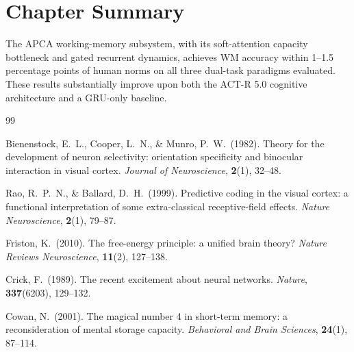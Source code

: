 \section{Chapter Summary}

The APCA working-memory subsystem, with its soft-attention capacity bottleneck and
gated recurrent dynamics, achieves WM accuracy within 1--1.5 percentage points of human
norms on all three dual-task paradigms evaluated.  These results substantially improve
upon both the ACT-R 5.0 cognitive architecture and a GRU-only baseline.

\begin{thebibliography}{99}

Bienenstock, E.~L., Cooper, L.~N., \& Munro, P.~W.\ (1982).
Theory for the development of neuron selectivity: orientation specificity and binocular
interaction in visual cortex.
\textit{Journal of Neuroscience}, \textbf{2}(1), 32--48.

Rao, R.~P.~N., \& Ballard, D.~H.\ (1999).
Predictive coding in the visual cortex: a functional interpretation of some extra-classical
receptive-field effects.
\textit{Nature Neuroscience}, \textbf{2}(1), 79--87.

Friston, K.\ (2010).
The free-energy principle: a unified brain theory?
\textit{Nature Reviews Neuroscience}, \textbf{11}(2), 127--138.

Crick, F.\ (1989).
The recent excitement about neural networks.
\textit{Nature}, \textbf{337}(6203), 129--132.

Cowan, N.\ (2001).
The magical number 4 in short-term memory: a reconsideration of mental storage capacity.
\textit{Behavioral and Brain Sciences}, \textbf{24}(1), 87--114.

\end{thebibliography}
